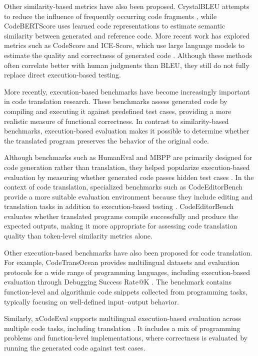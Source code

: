 Other similarity-based metrics have also been proposed. CrystalBLEU attempts to
reduce the influence of frequently occurring code fragments \cite{crystalbleu},
while CodeBERTScore uses learned code representations to estimate semantic
similarity between generated and reference code. More recent work has explored
metrics such as CodeScore and ICE-Score, which use large language models to
estimate the quality and correctness of generated code
\cite{codescore2023, ice_score}. Although these methods often correlate better
with human judgments than BLEU, they still do not fully replace direct
execution-based testing.

More recently, execution-based benchmarks have become increasingly important in
code translation research. These benchmarks assess generated code by compiling
and executing it against predefined test cases, providing a more realistic
measure of functional correctness. In contrast to similarity-based benchmarks,
execution-based evaluation makes it possible to determine whether the translated
program preserves the behavior of the original code.

Although benchmarks such as HumanEval and MBPP are primarily designed for code
generation rather than translation, they helped popularize execution-based
evaluation by measuring whether generated code passes hidden test cases
\cite{chen2021codex, austin2021mbpp}. In the context of code translation,
specialized benchmarks such as CodeEditorBench provide a more suitable
evaluation environment because they include editing and translation tasks in
addition to execution-based testing \cite{codeeditorbench}. CodeEditorBench
evaluates whether translated programs compile successfully and produce the
expected outputs, making it more appropriate for assessing code translation
quality than token-level similarity metrics alone.

Other execution-based benchmarks have also been proposed for code translation.
For example, CodeTransOcean provides multilingual datasets and evaluation
protocols for a wide range of programming languages, including execution-based
evaluation through Debugging Success Rate@K \cite{codetransocean}. The benchmark
contains function-level and algorithmic code snippets collected from programming
tasks, typically focusing on well-defined input–output behavior.

Similarly, xCodeEval supports multilingual execution-based evaluation across
multiple code tasks, including translation \cite{xcodeeval}. It includes a mix
of programming problems and function-level implementations, where correctness is
evaluated by running the generated code against test cases.

